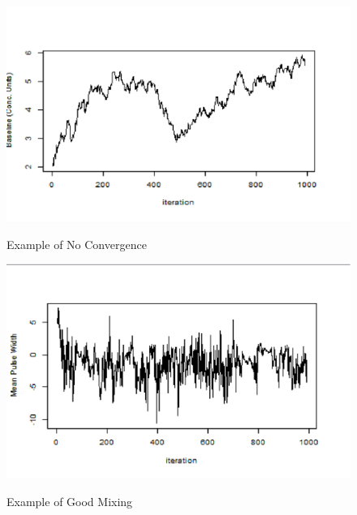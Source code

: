 \documentclass[11pt]{book}
\begin{document}
\begin{figure}
  \centering
  \includegraphics[width=\textwidth]{NC.PNG}\\
  \caption{Example of No Convergence}\label{no convergents}
\end{figure}


\begin{figure}
  \centering
  \includegraphics[width=\textwidth]{goodmixing.PNG}\\
  \caption{Example of Good Mixing}\label{good mixing}
\end{figure}
\end{document}
